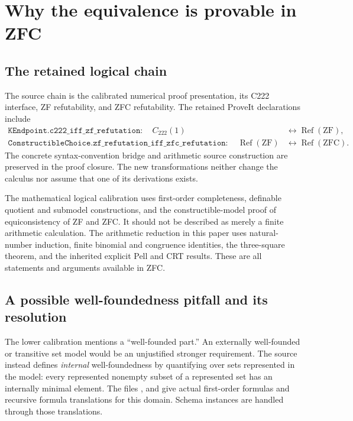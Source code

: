 \documentclass[10pt,letterpaper]{article}
\theoremstyle{definition}\newtheorem{definition}[theorem]{Definition}
\newcommand{\Refut}{\operatorname{Ref}}
\begin{document}
\section{Why the equivalence is provable in ZFC}\label{sec:logic}

\subsection{The retained logical chain}

The source chain is the calibrated numerical proof presentation,
its C222 interface, ZF refutability, and ZFC refutability. The retained
ProveIt declarations include
\begin{align*}
 \texttt{KEndpoint.c222\_iff\_zf\_refutation}:\quad
   C_{222}(1)&\longleftrightarrow\Refut(\mathrm{ZF}),\\
 \texttt{ConstructibleChoice.zf\_refutation\_iff\_zfc\_refutation}:\quad
   \Refut(\mathrm{ZF})&\longleftrightarrow\Refut(\mathrm{ZFC}).
\end{align*}
The concrete syntax-convention bridge and arithmetic source construction
are preserved in the proof closure. The new transformations neither change
the calculus nor assume that one of its derivations exists.

The mathematical logical calibration uses first-order completeness,
definable quotient and submodel constructions, and the constructible-model
proof of equiconsistency of ZF and ZFC. It should not be described as merely
a finite arithmetic calculation. The arithmetic reduction in this paper
uses natural-number induction, finite binomial and congruence identities,
the three-square theorem, and the inherited explicit Pell and CRT results.
These are all statements and arguments available in ZFC.

\subsection{A possible well-foundedness pitfall and its resolution}

The lower calibration mentions a ``well-founded part.'' An externally
well-founded or transitive set model would be an unjustified stronger
requirement. The source instead defines \emph{internal} well-foundedness
by quantifying over sets represented in the model:
every represented nonempty subset of a represented set has an internally
minimal element. The files ,
 and  give actual
first-order formulas and recursive formula translations for this domain.
Schema instances are handled through those translations.
\end{document}

